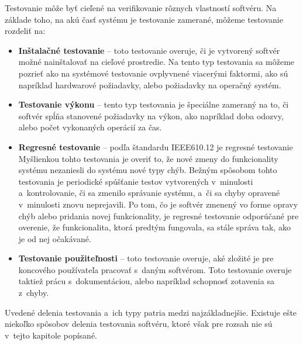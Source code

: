 \noindent Testovanie môže byť cieľené na verifikovanie rôznych 
vlastností softvéru. Na základe toho, na akú časť systému je 
testovanie zamerané, môžeme testovanie rozdeliť na:
\begin{itemize}
\item \textbf{Inštalačné testovanie} --
toto testovanie overuje, či je vytvorený softvér možné nainštalovať
na cieľové prostredie. Na tento typ testovania sa môžeme pozrieť ako na 
systémové testovanie ovplyvnené viacerými faktormi, ako sú napríklad 
hardwarové požiadavky, alebo požiadavky na operačný systém. 

\item \textbf{Testovanie výkonu} --
tento typ testovania je špeciálne zameraný na to, či softvér spĺňa 
stanovené požiadavky na výkon, ako napríklad doba odozvy, alebo počet 
vykonaných operácií za čas. 

\item \textbf{Regresné testovanie} --
\label{sekcia:regresne_testovanie}
podľa štandardu IEEE610.12 \cite{Ieee_glossary} je regresné testovanie 
Myšlienkou tohto testovania je overiť to, že nové zmeny do funkcionality 
systému nezaniesli do systému nové typy chýb.
Bežným spôsobom tohto testovania je periodické spúšťanie testov 
vytvorených v~minulosti a~kontrolovanie, či sa zmenilo správanie
systému, a~či sa chyby opravené v~minulosti znovu neprejavili. Po tom, 
čo je softvér zmenený vo forme opravy chýb alebo pridania novej 
funkcionality, je regresné testovanie odporúčané pre overenie, že 
funkcionalita, ktorá predtým fungovala, sa stále správa tak, ako je od 
nej očakávané.

\item \textbf{Testovanie použiteľnosti} --
toto testovanie overuje, aké zložité je pre koncového 
používateľa pracovať s~daným softvérom. Toto testovanie overuje taktiež 
prácu s~dokumentáciou, alebo napríklad schopnosť zotavenia sa z~chyby. 
\end{itemize}

Uvedené delenia testovania a~ich typy patria medzi najzákladnejšie. 
Existuje ešte niekoľko spôsobov delenia testovania softvéru, ktoré však 
pre rozsah nie sú v~tejto kapitole popísané.



